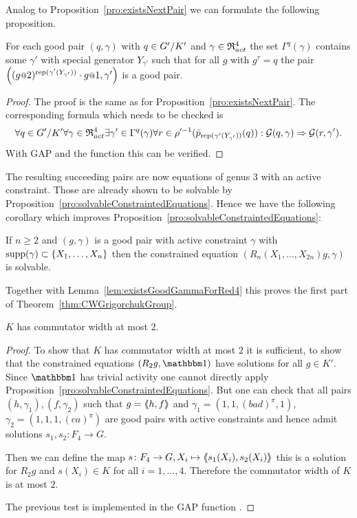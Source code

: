 \documentclass[a4paper,11pt]{amsart}
\begin{document}
Analog to Proposition~\ref{pro:existsNextPair} we can formulate the following proposition.
\begin{pro}\label{pro:existsNextPair4}
 For each good pair $(q,\gamma)$ with $q\in{G'/K'}$ and $\gamma\in\mathfrak{R}^4_{act}$ the set $\Gamma^q(\gamma)$ 
 contains some $\gamma'$ with special generator $Y_{\gamma'}$ such that for all $g$ with $g^\tau=q$ the
 pair $\left((g\at{2})^{\textup{rep}(\gamma'(Y_{\gamma'}))}\cdot g\at{1},\gamma'\right)$ is a good pair.
\end{pro}
\begin{proof}
The proof is the same as for Proposition~\ref{pro:existsNextPair}. The corresponding formula which needs to be checked is 
\[\forall q\in{G'/K'}
      \forall \gamma\in\mathfrak{R}^4_{act} 
	 \exists \gamma'\in \Gamma^q(\gamma)
	    \forall r\in \rho'^{-1}(\bar p_{\textup{rep}(\gamma'(Y_{\gamma'}))}(q)):
	      \mathcal{G}(q,\gamma) \Rightarrow \mathcal{G}(r,\gamma').\]
 With GAP and the function  this can be verified. 
\end{proof}
The resulting succeeding pairs are now equations of genus $3$ with an active constraint. 
Those are already shown to be solvable 
by Proposition~\ref{pro:solvableConstraintedEquations}. Hence we have the following
corollary which improves Proposition~\ref{pro:solvableConstraintedEquations}:
\begin{cor}\label{cor:solvableConstraintedEquations}
If $n\geq2$ and $(g,\gamma)$ is a good pair with active constraint $\gamma$ with $\operatorname{{supp}}(\gamma)\subset\{X_1,\dotsc,X_{n}\}$
 then the constrained equation $(R_n(X_1,\dotsc,X_{2n})g,\gamma)$ is solvable. 
\end{cor}
Together with Lemma~\ref{lem:existsGoodGammaForRed4} this proves the first part of Theorem~\ref{thm:CWGrigorchukGroup}.
\begin{cor}\label{cor:KhasCW2}
 $K$ has commutator width at most $2$. 
\end{cor}
\begin{proof}
 To show that $K$ has commutator width at most $2$ it is sufficient, to show that 
 the constrained equations $(R_2g,\id)$ have solutions for all $g\in K'$. 
 Since $\id$ has trivial activity one cannot directly apply 
 Proposition~\ref{pro:solvableConstraintedEquations}.  But one can check that all 
 pairs $(h,\gamma_1),(f,\gamma_2)$ such that $g=\langle\negthickspace\langle h,f\rangle\negthickspace\rangle$ and
 $\gamma_1=(1,1,(bad)^\pi,1)$, $\gamma_2=(1,1,1,(ca)^\pi)$ are good pairs with active
 constraints and hence admit solutions $s_1,s_2\colon F_4\to G$.
 
 Then we can define the map $s\colon F_4\to G, X_i\mapsto \langle\negthickspace\langle s_1(X_i),s_2(X_i)\rangle\negthickspace\rangle$ this is a solution
 for $R_2g$ and $s(X_i)\in K$ for all $i=1,\dotsc,4$. Therefore the commutator width of $K$ is at most $2$.
 
 The previous test is implemented in the GAP function . 
\end{proof}
\end{document}

